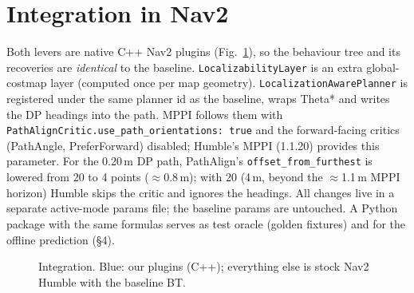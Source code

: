 \documentclass[10pt,twocolumn]{article}
\begin{document}
\section{Integration in Nav2}
Both levers are native C++ Nav2 plugins (Fig.~\ref{fig:nav2}), so the behaviour tree and its recoveries are \emph{identical} to the baseline. \texttt{LocalizabilityLayer} is an extra global-costmap layer (computed once per map geometry). \texttt{LocalizationAwarePlanner} is registered under the same planner id as the baseline, wraps Theta* and writes the DP headings into the path. MPPI follows them with \texttt{PathAlignCritic.use\_path\_orientations: true} and the forward-facing critics (PathAngle, PreferForward) disabled; Humble's MPPI (1.1.20) provides this parameter. For the 0.20\,m DP path, PathAlign's \texttt{offset\_from\_furthest} is lowered from 20 to 4 points ($\approx$0.8\,m); with 20 (4\,m, beyond the $\approx$1.1\,m MPPI horizon) Humble skips the critic and ignores the headings. All changes live in a separate active-mode params file; the baseline params are untouched. A Python package with the same formulas serves as test oracle (golden fixtures) and for the offline prediction (\S4).

\begin{figure}[t]
\centering
{}
\caption{Integration. Blue: our plugins (C++); everything else is stock Nav2 Humble with the baseline BT.}
\label{fig:nav2}
\end{figure}
\end{document}
